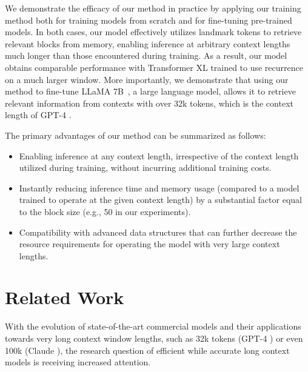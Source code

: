 We demonstrate the efficacy of our method in practice by applying our training method both for training models from scratch and for fine-tuning pre-trained models. In both cases, our model effectively utilizes landmark tokens to retrieve relevant blocks from memory, enabling inference at arbitrary context lengths much longer than those encountered during training. As a result, our model obtains comparable performance with Transformer XL trained to use recurrence on a much larger window. More importantly, we demonstrate that using our method to fine-tune LLaMA 7B~\cite{touvron_llama_2023}, a large language model, allows it to retrieve relevant information from contexts with over 32k tokens, which is the context length of GPT-4 \cite{openai2023gpt4}.

The primary advantages of our method can be summarized as follows:

\begin{itemize}
	\item Enabling inference at any context length, irrespective of the context length utilized during training, without incurring additional training costs.
	\item Instantly reducing inference time and memory usage (compared to a model trained to operate at the given context length) by a substantial factor equal to the block size (e.g., 50 in our experiments).
	\item Compatibility with advanced data structures that can further decrease the resource requirements for operating the model with very large context lengths.
\end{itemize}

\section{Related Work}

With the evolution of state-of-the-art commercial models and their applications towards very long context window lengths, such as 32k tokens (GPT-4 \cite{openai2023gpt4}) or even 100k (Claude \cite{anthropic2023claude}), the research question of efficient while accurate long context models is receiving increased attention.

